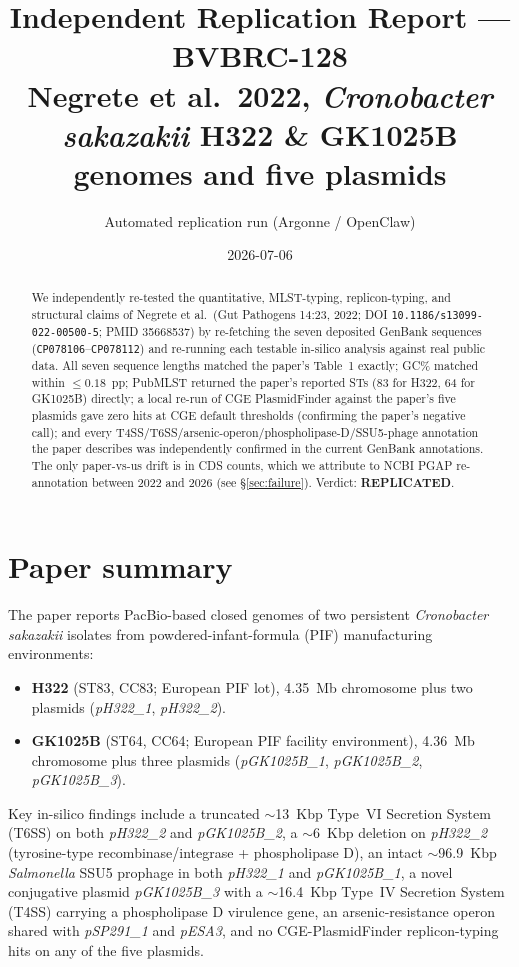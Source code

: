 \documentclass[11pt]{article}
\title{Independent Replication Report --- BVBRC-128\\
Negrete et al.\ 2022, \emph{Cronobacter sakazakii} H322 \& GK1025B genomes and five plasmids}
\author{Automated replication run (Argonne / OpenClaw)}
\date{2026-07-06}
\begin{document}
\maketitle

\begin{abstract}
We independently re-tested the quantitative, MLST-typing, replicon-typing, and structural claims
of Negrete et al.\ (Gut Pathogens 14:23, 2022; DOI \texttt{10.1186/s13099-022-00500-5}; PMID
35668537) by re-fetching the seven deposited GenBank sequences (\texttt{CP078106}--\texttt{CP078112})
and re-running each testable in-silico analysis against real public data. All seven sequence
lengths matched the paper's Table~1 exactly; GC\% matched within $\leq 0.18$~pp; PubMLST returned
the paper's reported STs (83 for H322, 64 for GK1025B) directly; a local re-run of CGE
PlasmidFinder against the paper's five plasmids gave zero hits at CGE default thresholds
(confirming the paper's negative call); and every T4SS/T6SS/arsenic-operon/phospholipase-D/SSU5-phage
annotation the paper describes was independently confirmed in the current GenBank annotations.
The only paper-vs-us drift is in CDS counts, which we attribute to NCBI PGAP re-annotation between
2022 and 2026 (see \S\ref{sec:failure}). Verdict: \textbf{REPLICATED}.
\end{abstract}

\section{Paper summary}
The paper reports PacBio-based closed genomes of two persistent \emph{Cronobacter sakazakii}
isolates from powdered-infant-formula (PIF) manufacturing environments:
\begin{itemize}
  \item \textbf{H322} (ST83, CC83; European PIF lot), 4.35~Mb chromosome plus two plasmids
        (\emph{pH322\_1}, \emph{pH322\_2}).
  \item \textbf{GK1025B} (ST64, CC64; European PIF facility environment), 4.36~Mb chromosome plus
        three plasmids (\emph{pGK1025B\_1}, \emph{pGK1025B\_2}, \emph{pGK1025B\_3}).
\end{itemize}
Key in-silico findings include a truncated $\sim$13~Kbp Type~VI Secretion System (T6SS) on both
\emph{pH322\_2} and \emph{pGK1025B\_2}, a $\sim$6~Kbp deletion on \emph{pH322\_2}
(tyrosine-type recombinase/integrase + phospholipase D), an intact $\sim$96.9~Kbp
\emph{Salmonella} SSU5 prophage in both \emph{pH322\_1} and \emph{pGK1025B\_1}, a novel
conjugative plasmid \emph{pGK1025B\_3} with a $\sim$16.4~Kbp Type~IV Secretion System (T4SS)
carrying a phospholipase D virulence gene, an arsenic-resistance operon shared with
\emph{pSP291\_1} and \emph{pESA3}, and no CGE-PlasmidFinder replicon-typing hits on any of the
five plasmids.
\end{document}
